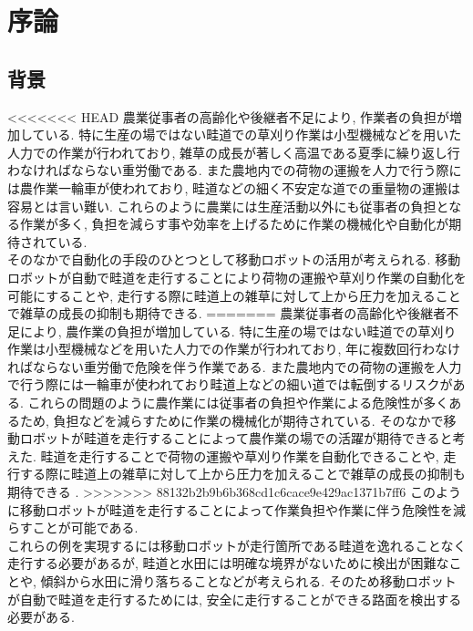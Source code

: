 \chapter{序論}
\section{背景}
<<<<<<< HEAD
農業従事者の高齢化や後継者不足により, 作業者の負担が増加している. 
特に生産の場ではない畦道での草刈り作業は小型機械などを用いた人力での作業が行われており, 
雑草の成長が著しく高温である夏季に繰り返し行わなければならない重労働である. 
また農地内での荷物の運搬を人力で行う際には農作業一輪車が使われており, 
畦道などの細く不安定な道での重量物の運搬は容易とは言い難い. 
これらのように農業には生産活動以外にも従事者の負担となる作業が多く, 
負担を減らす事や効率を上げるために作業の機械化や自動化が期待されている. 
\\そのなかで自動化の手段のひとつとして移動ロボットの活用が考えられる. 
移動ロボットが自動で畦道を走行することにより荷物の運搬や草刈り作業の自動化を可能にすることや, 
走行する際に畦道上の雑草に対して上から圧力を加えることで雑草の成長の抑制も期待できる\cite{稲垣栄洋2017踏圧処理が畦畔雑草植生に及ぼす影響}. 
=======
農業従事者の高齢化や後継者不足により, 農作業の負担が増加している. 
特に生産の場ではない畦道での草刈り作業は小型機械などを用いた人力での作業が行われており, 年に複数回行わなければならない重労働で危険を伴う作業である. 
また農地内での荷物の運搬を人力で行う際には一輪車が使われており畦道上などの細い道では転倒するリスクがある. 
これらの問題のように農作業には従事者の負担や作業による危険性が多くあるため, 負担などを減らすために作業の機械化が期待されている.
そのなかで移動ロボットが畦道を走行することによって農作業の場での活躍が期待できると考えた. 
畦道を走行することで荷物の運搬や草刈り作業を自動化できることや, 走行する際に畦道上の雑草に対して上から圧力を加えることで雑草の成長の抑制も期待できる\cite{長橋孝哉2019ニューラルネットワークを用いた畦道の雑草検出に関する研究}
. 
>>>>>>> 88132b2b9b6b368cd1c6cace9e429ac1371b7ff6
このように移動ロボットが畦道を走行することによって作業負担や作業に伴う危険性を減らすことが可能である. 
\\これらの例を実現するには移動ロボットが走行箇所である畦道を逸れることなく走行する必要があるが, 
畦道と水田には明確な境界がないために検出が困難なことや, 傾斜から水田に滑り落ちることなどが考えられる. 
そのため移動ロボットが自動で畦道を走行するためには, 安全に走行することができる路面を検出する必要がある.
